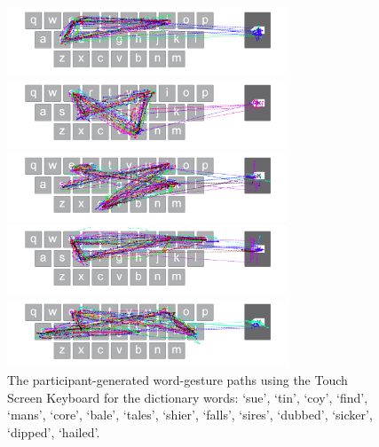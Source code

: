 \begin{figure}[!b]
	\begin{minipage}[t]{8in}
	\hspace{-20pt}
	\begin{minipage}[t]{3.1in}
		\includegraphics[width=3.3in]{Figures/fig_sires_paths}
	\end{minipage}
	\begin{minipage}[t]{3in}
		\includegraphics[width=3.3in]{Figures/fig_dubbed_paths}
	\end{minipage}
	\end{minipage}
	
	\begin{minipage}[t]{8in}
	\hspace{-20pt}
	\begin{minipage}[t]{3.1in}
		\includegraphics[width=3.3in]{Figures/fig_sicker_paths}
	\end{minipage}
	\begin{minipage}[t]{3in}
		\includegraphics[width=3.3in]{Figures/fig_dipped_paths}
	\end{minipage}
	\end{minipage}
	
	\begin{minipage}[t]{8in}
	\hspace{-20pt}
	\begin{minipage}[t]{3.1in}
		\includegraphics[width=3.3in]{Figures/fig_hailed_paths}
	\end{minipage}
	\end{minipage}
	\caption[User Generated Paths for the Touch Screen Keyboard]{The participant-generated word-gesture paths using the Touch Screen Keyboard for the dictionary words: `sue', `tin', `coy', `find', `mans', `core', `bale', `tales', `shier', `falls', `sires', `dubbed', `sicker', `dipped', `hailed'.}
\end{figure}

